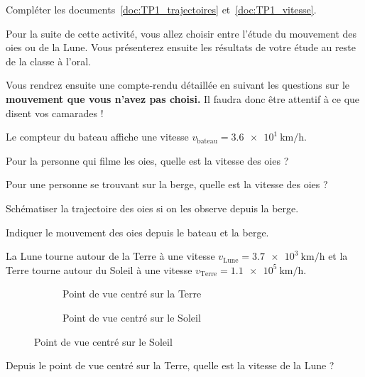 
\numeroQuestion
Compléter les documents~\ref{doc:TP1_trajectoires} et~\ref{doc:TP1_vitesse}.

\fleche Pour la suite de cette activité, vous allez choisir entre l'étude du mouvement des oies ou de la Lune.
Vous présenterez ensuite les résultats de votre étude au reste de la classe à l'oral.

\fleche Vous rendrez ensuite une compte-rendu détaillée en suivant les questions sur le \textbf{mouvement que vous n'avez pas choisi.}
Il faudra donc être attentif à ce que disent vos camarades !


\newpage
{}

Le compteur du bateau affiche une vitesse $v_\text{bateau} = \qty{3,6e1}{\km/\hour}$.

\vspace*{6pt}
\numeroQuestion Pour la personne qui filme les oies, quelle est la vitesse des oies ?

\numeroQuestion Pour une personne se trouvant sur la berge, quelle est la vitesse des oies ?

\numeroQuestion Schématiser la trajectoire des oies si on les observe depuis la berge.

\numeroQuestion Indiquer le mouvement des oies depuis le bateau et la berge.


La Lune tourne autour de la Terre à une vitesse $v_\text{Lune} = \qty{3,7e3}{\km/\hour}$
et la Terre tourne autour du Soleil à une vitesse $v_\text{Terre} = \qty{1,1e5}{\km/\hour}$.

\begin{figure}[!ht]
  \begin{subfigure}{0.48\linewidth}
    \centering
    \caption{Point de vue centré sur la Terre}
    \label{fig:terre_lune}
  \end{subfigure}
  \begin{subfigure}{0.48\linewidth}
    \centering
    \caption{Point de vue centré sur le Soleil}
    \label{fig:terre_lune_soleil}
  \end{subfigure}
\end{figure}

\vspace*{-6pt}
\numeroQuestion Depuis le point de vue centré sur la Terre, quelle est la vitesse de la Lune ?

